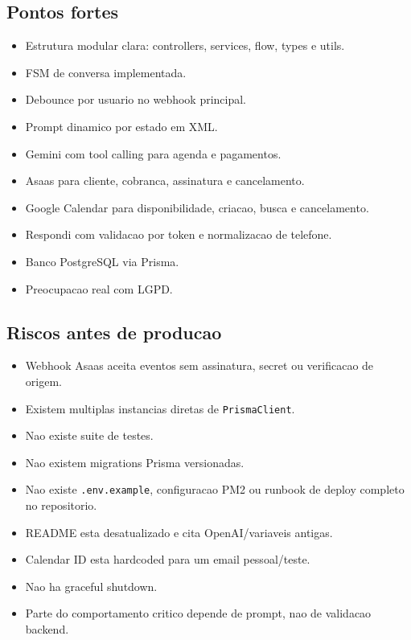 \documentclass[11pt,a4paper]{article}
\begin{document}
\subsection{Pontos fortes}

\begin{itemize}
  \item Estrutura modular clara: controllers, services, flow, types e utils.
  \item FSM de conversa implementada.
  \item Debounce por usuario no webhook principal.
  \item Prompt dinamico por estado em XML.
  \item Gemini com tool calling para agenda e pagamentos.
  \item Asaas para cliente, cobranca, assinatura e cancelamento.
  \item Google Calendar para disponibilidade, criacao, busca e cancelamento.
  \item Respondi com validacao por token e normalizacao de telefone.
  \item Banco PostgreSQL via Prisma.
  \item Preocupacao real com LGPD.
\end{itemize}

\subsection{Riscos antes de producao}

\begin{itemize}
  \item Webhook Asaas aceita eventos sem assinatura, secret ou verificacao de origem.
  \item Existem multiplas instancias diretas de \texttt{PrismaClient}.
  \item Nao existe suite de testes.
  \item Nao existem migrations Prisma versionadas.
  \item Nao existe \texttt{.env.example}, configuracao PM2 ou runbook de deploy completo no repositorio.
  \item README esta desatualizado e cita OpenAI/variaveis antigas.
  \item Calendar ID esta hardcoded para um email pessoal/teste.
  \item Nao ha graceful shutdown.
  \item Parte do comportamento critico depende de prompt, nao de validacao backend.
\end{itemize}
\end{document}
